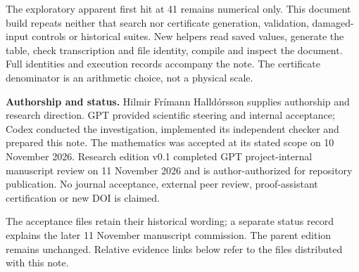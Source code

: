 \documentclass[11pt,a4paper]{article}
\numberwithin{equation}{section}
\theoremstyle{remark}\newtheorem{remark}[theorem]{Remark}
\begin{document}
The exploratory apparent first hit at 41 remains numerical only. This document build repeats neither that search nor certificate generation, validation, damaged-input controls or historical suites. New helpers read saved values, generate the table, check transcription and file identity, compile and inspect the document. Full identities and execution records accompany the note. The certificate denominator is an arithmetic choice, not a physical scale.

\textbf{Authorship and status.} Hilmir Fr\'imann Halld\'orsson supplies authorship and research direction. GPT provided scientific steering and internal acceptance; Codex conducted the investigation, implemented its independent checker and prepared this note. The mathematics was accepted at its stated scope on 10 November 2026. Research edition v0.1 completed GPT project-internal manuscript review on 11 November 2026 and is author-authorized for repository publication. No journal acceptance, external peer review, proof-assistant certification or new DOI is claimed.

The acceptance files retain their historical wording; a separate status record explains the later 11 November manuscript commission. The parent edition remains unchanged. Relative evidence links below refer to the files distributed with this note.


\end{document}
